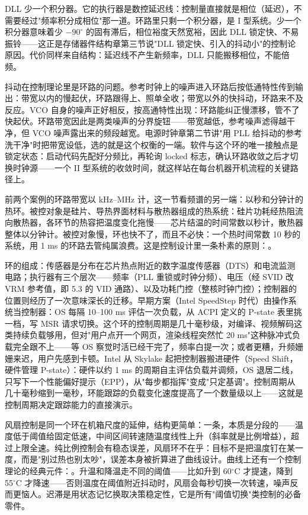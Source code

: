 DLL 少一个积分器。它的执行器是数控延迟线：控制量直接就是相位（延迟），不需要经过"频率积分成相位"那一道。环路里只剩一个积分器，是 I 型系统。少一个积分器意味着少 $-90^{\circ}$ 的固有滞后，相位裕度天然宽裕，因此 DLL 锁定快、不易振铃——这正是存储器件结构章第三节说"DLL 锁定快、引入的抖动小"的控制论原因。代价同样来自结构：延迟线不产生新频率，DLL 只能搬移相位，不能倍频。

抖动在控制理论里是环路的问题。参考时钟上的噪声进入环路后按低通特性传到输出：带宽以内的慢起伏，环路跟得上、照单全收；带宽以外的快抖动，环路来不及反应。VCO 自身的噪声正好相反，按高通特性出现：环路能纠正慢漂移，管不了快起伏。环路带宽因此是两类噪声的分界旋钮——带宽越低，参考噪声滤得越干净，但 VCO 噪声露出来的频段越宽。电源时钟章第二节讲"用 PLL 给抖动的参考洗干净"时把带宽设低，选的就是这个权衡的一端。软件与这个环的唯一接触点是锁定状态：启动代码先配好分频比，再轮询 locked 标志，确认环路收敛之后才切换时钟源——一个 II 型系统的收敛时间，就这样站在每台机器开机流程的关键路径上。


前两个案例的环路带宽以 kHz--MHz 计，这一节看频谱的另一端：以秒和分钟计的热环。被控对象是硅片、导热界面材料与散热器组成的热系统：硅片功耗经热阻流向散热器，各环节的热容把温度变化拖慢——芯片结温的时间常数以秒计，散热器整体以分钟计。被控对象慢，环也快不了，而且不必快：一个热时间常数 10 秒的系统，用 1 ms 的环路去管纯属浪费。这是控制设计里一条朴素的原则：。

环的组成：传感器是分布在芯片热点附近的数字温度传感器（DTS）和电流监测电路；执行器有三个层次——频率（PLL 重锁或时钟分频）、电压（经 SVID 改 VRM 参考值，即 5.3 的 VID 通路）、以及功耗门控（整核时钟门控）；控制器的位置则经历了一次意味深长的迁移。早期方案（Intel SpeedStep 时代）由操作系统当控制器：OS 每隔 10--100 ms 评估一次负载，从 ACPI 定义的 P-state 表里挑一档，写 MSR 请求切换。这个环的控制周期是几十毫秒级，对编译、视频解码这类持续负载够用，但对"用户点开一个网页，渲染线程突然忙 20 ms"这种脉冲式负载完全跟不上——等 OS 察觉时活已经干完了，频率白提一次；或者更糟，升频姗姗来迟，用户先感到卡顿。Intel 从 Skylake 起把控制器搬进硬件（Speed Shift，硬件管理 P-state）：硬件以约 1 ms 的周期自主评估负载并调频，OS 退居二线，只写下一个性能偏好提示（EPP），从"每步都指挥"变成"只定基调"。控制周期从几十毫秒缩到一毫秒，环能跟踪的负载变化速度提高了一个数量级以上——这就是控制周期决定跟踪能力的直接演示。

风扇控制是同一个环在机箱尺度的延伸，结构更简单：一条，本质是分段的——温度低于阈值给固定低速，中间区间转速随温度线性上升（斜率就是比例增益），超过上限全速。纯比例控制会有稳态误差，风扇环不在乎：目标不是把温度钉在某一度，而是"别过热也别太吵"，误差本身被折算进了曲线设计。曲线上还有一个控制理论的经典元件：。升温和降温走不同的阈值——比如升到 60$^{\circ}$C 才提速，降到 55$^{\circ}$C 才降速——否则温度在阈值附近抖动时，风扇会每秒切换一次转速，噪声反而更恼人。迟滞是用状态记忆换取决策稳定性，它是所有"阈值切换"类控制的必备零件。

